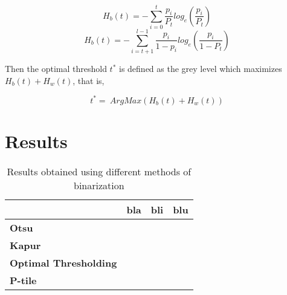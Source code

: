 \documentclass[12]{article}
\begin{document}
$$H_b(t) = - \sum_{i = 0}^{t} \frac{p_i}{P_t}log_e\left(\frac{p_i}{P_t}\right)$$
$$ H_b(t) = - \sum_{i = t+1}^{l-1} \frac{p_i}{1-p_i}log_e\left(\frac{p_i}{1-P_t}\right)$$

Then the optimal threshold $t^{*}$ is defined as the grey level which maximizes $H_b(t)+H_w(t)$, that is, 
\vspace{-0.5cm}
\begin{center}
$$t^{*}=\ ArgMax\left(H_b(t) + H_w(t)\right)$$
\end{center}
\section{Results}

\begin{table}[h]
\centering
\begin{tabular}{|l|l|l|l|}
\hline
& bla & bli & blu \\  \hline
\textbf{Otsu} &  &  &  \\ \hline
 \textbf{Kapur} & & &  \\  \hline
 \textbf{Optimal Thresholding} & & &  \\ \hline
  \textbf{P-tile} & & & \\ \hline
\end{tabular}
\caption{Results obtained using different methods of binarization}
\label{Results}
\end{table}
\end{document}
